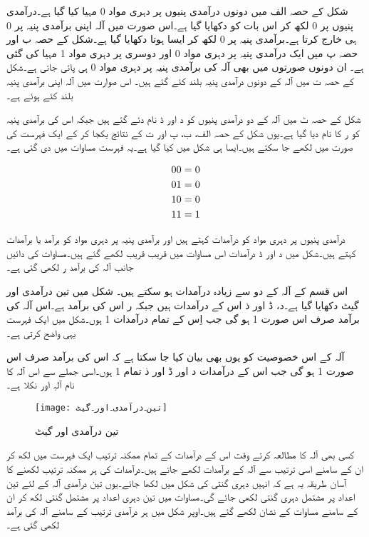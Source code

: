 شکل کے حصہ الف میں دونوں درآمدی پنیوں پر دہری مواد 0 مہیا کیا گیا ہے۔درآمدی پنیوں پر 0 لکھ کر اس بات کو دکھایا گیا ہے۔اس صورت میں آلہ اپنی برآمدی پنیہ پر 0 ہی خارج کرتا ہے۔برآمدی پنیہ پر 0 لکھ کر ایسا ہوتا دکھایا گیا ہے۔شکل کے حصہ ب اور حصہ پ میں ایک درآمدی پنیہ پر دہری مواد 0 اور دوسری پر دہری مواد  1 مہیا کی گئی ہے۔ ان دونوں صورتوں میں بھی آلہ کی برآمدی پنیہ پر دہری مواد 0 ہی پائی جاتی ہے۔شکل کے حصہ ت میں آلہ کے دونوں درآمدی پنیہ بلند کئے گئے ہیں۔ اس صوارت میں آلہ اپنی برآمدی پنیہ بلند کئے ہوئے ہے۔

شکل کے حصہ ٹ میں آلہ کے دو درآمدی پنیوں کو د اور ڈ نام دئے گئے ہیں جبکہ اس کی برآمدی پنیہ کو ر کا نام دیا گیا ہے۔یوں شکل کے حصہ الف، ب، پ اور ت کے نتائج یکجا کر کے ایک فہرست کی صورت میں لکھے جا سکتے ہیں۔ایسا ہی شکل میں کیا گیا ہے۔یہ فہرست مساوات  میں دی گئی ہے۔

\begin{align}  \label{مساوات۔اور۔گیٹ}
00 & =0 \notag \\
01 & =0 \notag \\
10 &=0 \notag \\
11 &=1  
\end{align}

درآمدی پنیوں پر دہری مواد کو درآمدات کہتے ہیں اور برآمدی پنیہ پر دہری مواد کو برآمد یا برآمدات کہتے ہیں۔شکل میں د اور ڈ درآمدات اس مساوات میں قریب قریب لکھے گئے ہیں۔مساوات کی دائیں جانب آلہ کی برآمد ر لکھی گئی ہے۔

اس قسم کے آلہ کے دو سے زیادہ درآمدات ہو سکتے ہیں۔ شکل  میں تین درآمدی اور گیٹ دکھایا گیا ہے۔د، ڈ اور ذ اس کے درآمدات ہیں جبکہ ر اس کی برآمد ہے۔اس آلہ کی برآمد صرف اس صورت 1 ہو گی جب اِس کے تمام درآمدات 1 ہوں۔شکل میں ایک فہرست یہی واضح کرتی ہے۔

آلہ کے اس خصوصیت کو یوں بھی بیان کیا جا سکتا ہے کہ اس کی برآمد صرف اس صورت 1 ہو گی جب اس کے درآمدات د اور ڈ اور ذ تمام 1 ہوں۔اسی جملے سے اس آلہ کا نام آلہِ  اور  نکلا ہے۔



\begin{figure}[th]
 \begin{center}
  \texttt{[image: تین۔درآمدی۔اور۔گیٹ]}
 \end{center}
\caption{تین درآمدی اور گیٹ}
\label{شکل۔تین۔درآمدی۔اور۔گیٹ}
\end{figure}


کسی بھی آلہ کا مطالعہ کرتے وقت اس کے درآمدات کے تمام ممکنہ ترتیب ایک فہرست میں لکھ کر ان کے سامنے اسی ترتیب سے آلہ کے برآمدات لکھے جاتے ہیں۔درآمدات کی ہر ممکنہ ترتیب لکھنے کا آسان طریقہ یہ ہے کہ انہیں دہری گنتی کی شکل میں لکھا جائے۔یوں تین درآمدی آلہ کے لئے تین اعداد پر مشتمل دہری گنتی لکھی جائے گی۔مساوات  میں تین دہری اعداد پر مشتمل گنتی لکھ کر ان کے سامنے مساوات کے نشان لکھے گئے ہیں۔اوپر شکل میں ہر درآمدی ترتیب کے سامنے آلہ کی برآمد لکھی گئی ہے۔

